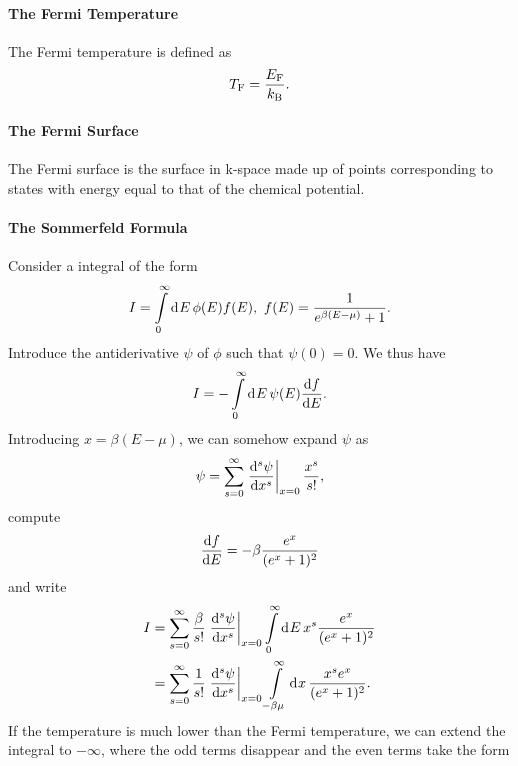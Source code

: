 \paragraph{The Fermi Temperature}
The Fermi temperature is defined as
\begin{align*}
	T_{\text{F}} = \frac{E_{\text{F}}}{k_{\text{B}}}.
\end{align*}

\paragraph{The Fermi Surface}
The Fermi surface is the surface in k-space made up of points corresponding to states with energy equal to that of the chemical potential.

\paragraph{The Sommerfeld Formula}
Consider a integral of the form
\begin{align*}
	I = \int\limits_{0}^{\infty}\dd[]{E}\phi(E)f(E),\ f(E) = \frac{1}{e^{\beta(E - \mu)} + 1}.
\end{align*}
Introduce the antiderivative $\psi$ of $\phi$ such that $\psi(0) = 0$. We thus have
\begin{align*}
	I = -\int\limits_{0}^{\infty}\dd[]{E}\psi(E)\dv{f}{E}.
\end{align*}
Introducing $x = \beta(E - \mu)$, we can somehow expand $\psi$ as
\begin{align*}
	\psi = \sum\limits_{s = 0}^{\infty}\eval{\dv[s]{\psi}{x}}_{x = 0}\frac{x^{s}}{s!},
\end{align*}
compute
\begin{align*}
	\dv{f}{E} = -\beta\frac{e^{x}}{(e^{x} + 1)^{2}}
\end{align*}
and write
\begin{align*}
	I &= \sum\limits_{s = 0}^{\infty}\frac{\beta}{s!}\eval{\dv[s]{\psi}{x}}_{x = 0}\integ{0}{\infty}{E}{x^{s}\frac{e^{x}}{(e^{x} + 1)^{2}}} \\
	  &= \sum\limits_{s = 0}^{\infty}\frac{1}{s!}\eval{\dv[s]{\psi}{x}}_{x = 0}\integ{-\beta\mu}{\infty}{x}{\frac{x^{s}e^{x}}{(e^{x} + 1)^{2}}}.
\end{align*}
If the temperature is much lower than the Fermi temperature, we can extend the integral to $-\infty$, where the odd terms disappear and the even terms take the form
